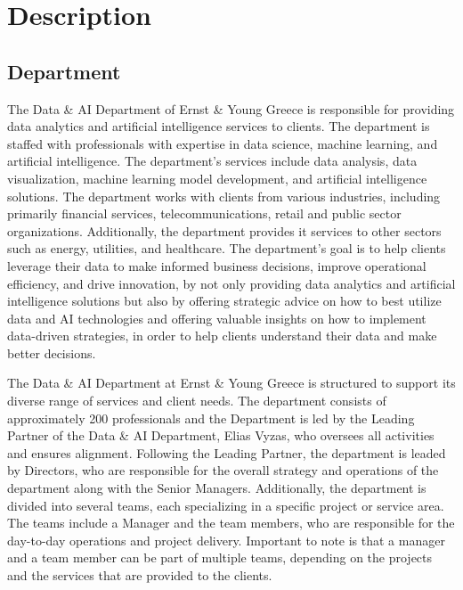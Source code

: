 \chapter{Description}
\label{ch:description}

\section{Department}

The Data \& AI Department of Ernst \& Young Greece is responsible for providing
data analytics and artificial intelligence services to clients. The department
is staffed with professionals with expertise in data science, machine learning,
and artificial intelligence. The department's services include data analysis,
data visualization, machine learning model development, and artificial
intelligence solutions. The department works with clients from various
industries, including primarily financial services, telecommunications, retail
and public sector organizations. Additionally, the department provides it
services to other sectors such as energy, utilities, and healthcare. The
department's goal is to help clients leverage their data to make informed
business decisions, improve operational efficiency, and drive innovation, by
not only providing data analytics and artificial intelligence solutions but
also by offering strategic advice on how to best utilize data and AI
technologies and offering valuable insights on how to implement data-driven
strategies, in order to help clients understand their data and make better
decisions.

The Data \& AI Department at Ernst \& Young Greece is structured to support its
diverse range of services and client needs. The department consists of
approximately 200 professionals and the Department is led by the Leading
Partner of the Data \& AI Department, Elias Vyzas, who oversees all activities
and ensures alignment. Following the Leading Partner, the department is leaded
by Directors, who are responsible for the overall strategy and operations of
the department along with the Senior Managers. Additionally, the department is
divided into several teams, each specializing in a specific project or service
area. The teams include a Manager and the team members, who are responsible for
the day-to-day operations and project delivery. Important to note is that a
manager and a team member can be part of multiple teams, depending on the
projects and the services that are provided to the clients.

